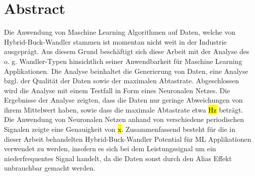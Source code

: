 \section*{Abstract}

Die Anwendung von Maschine Learning Algorithmen auf Daten, welche von Hybrid-Buck-Wandler stammen ist momentan nicht weit in der Industrie ausgeprägt. Aus diesem Grund beschäftigt sich diese Arbeit mit der Analyse des o. g. Wandler-Typen hinsichtlich seiner Anwendbarkeit für Maschine Learning Applikationen. Die Analyse beinhaltet die Generierung von Daten, eine Analyse bzgl. der Qualität der Daten sowie der maximalen Abtastrate. Abgeschlossen wird die Analyse mit einem Testfall in Form eines Neuronalen Netzes. Die Ergebnisse der Analyse zeigten, dass die Daten nur geringe Abweichungen von ihrem Mittelwert haben, sowie dass die maximale Abtastrate etwa \hl{Hz} beträgt. Die Anwendung von Neuronalen Netzen anhand von verschiedene periodischen Signalen zeigte eine Genauigkeit von \hl{x}. Zusammenfassend besteht für die in dieser Arbeit behandelten Hybrid-Buck-Wandler Potential für ML Applikationen verwendet zu werden, insofern es sich bei dem Leistungssignal um ein niederfrequentes Signal handelt, da die Daten sonst durch den Alias Effekt unbrauchbar gemacht werden. 